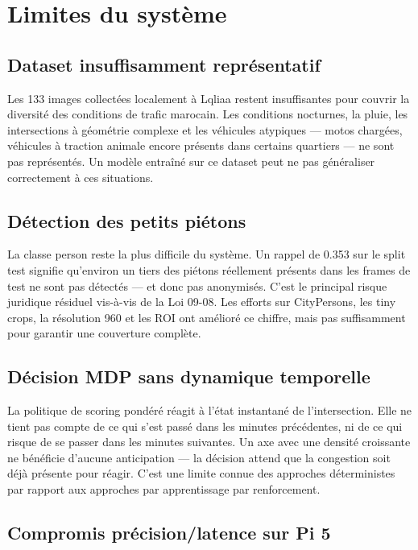 \section{Limites du système}

\subsection{Dataset insuffisamment
            représentatif}

Les 133 images collectées localement
à Lqliaa restent insuffisantes pour
couvrir la diversité des conditions
de trafic marocain. Les conditions
nocturnes, la pluie, les intersections
à géométrie complexe et les véhicules
atypiques — motos chargées, véhicules
à traction animale encore présents
dans certains quartiers — ne sont pas
représentés. Un modèle entraîné sur
ce dataset peut ne pas généraliser
correctement à ces situations.

\subsection{Détection des petits piétons}

La classe person reste la plus difficile
du système. Un rappel de 0.353 sur le
split test signifie qu'environ un tiers
des piétons réellement présents dans
les frames de test ne sont pas détectés
— et donc pas anonymisés. C'est le
principal risque juridique résiduel
vis-à-vis de la Loi 09-08. Les efforts
sur CityPersons, les tiny crops, la
résolution 960 et les ROI ont amélioré
ce chiffre, mais pas suffisamment pour
garantir une couverture complète.

\subsection{Décision MDP sans dynamique
            temporelle}

La politique de scoring pondéré réagit
à l'état instantané de l'intersection.
Elle ne tient pas compte de ce qui
s'est passé dans les minutes précédentes,
ni de ce qui risque de se passer dans
les minutes suivantes. Un axe avec une
densité croissante ne bénéficie d'aucune
anticipation — la décision attend que
la congestion soit déjà présente pour
réagir. C'est une limite connue des
approches déterministes par rapport aux
approches par apprentissage par
renforcement.

\subsection{Compromis précision/latence
            sur Pi 5}


